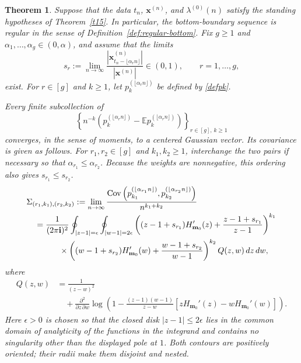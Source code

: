 \documentclass[11pt]{amsart}
\theoremstyle{plain}
\newtheorem{theorem}{Theorem}
\numberwithin{equation}{section}
\numberwithin{theorem}{section}
\numberwithin{figure}{section}
\begin{document}
\begin{theorem}
\label{t31}
Suppose that the data $t_n$, $\mathbf x^{(n)}$, and
$\lambda^{(0)}(n)$ satisfy the standing hypotheses of
Theorem~\ref{t15}.  In particular, the bottom-boundary sequence is
regular in the sense of Definition~\ref{def:regular-bottom}.  Fix $g\geq1$ and
$\alpha_1,\ldots,\alpha_g\in(0,\alpha)$, and assume that the limits
\begin{equation}
    s_r
    :=
    \lim_{n\to\infty}
    \frac{
        |\mathbf x^{(n)}_{t_n-\lfloor\alpha_r n\rfloor}|
    }{
        |\mathbf x^{(n)}|
    }
    \in(0,1),
    \qquad r=1,\ldots,g,
    \label{eq:section4-tail-limits}
\end{equation}
exist. For $r\in[g]$ and $k\geq1$, let
$p_k^{(\lfloor\alpha_rn\rfloor)}$ be defined by \eqref{defpk}.

Every finite subcollection of
\begin{equation}
    \left\{
        n^{-k}\left(
            p_k^{(\lfloor\alpha_rn\rfloor)}
            -\mathbb E p_k^{(\lfloor\alpha_rn\rfloor)}
        \right)
    \right\}_{r\in[g],\,k\geq1}
    \label{crv}
\end{equation}
converges, in the sense of moments, to a centered Gaussian vector. Its
covariance is given as follows. For $r_1,r_2\in[g]$ and
$k_1,k_2\geq1$,
{
interchange the two pairs if necessary so that
$\alpha_{r_1}\leq\alpha_{r_2}$.  Because the weights are nonnegative,
this ordering also gives $s_{r_1}\leq s_{r_2}$. }
\begin{align}
&\Sigma_{(r_1,k_1),(r_2,k_2)}
:=
\lim_{n\to\infty}
\frac{
    \operatorname{Cov}\left(
        p_{k_1}^{(\lfloor\alpha_{r_1}n\rfloor)},
        p_{k_2}^{(\lfloor\alpha_{r_2}n\rfloor)}
    \right)
}{n^{k_1+k_2}}
\label{covf}\\
&\quad=
\frac{1}{(2\pi\mathbf i)^2}
\oint_{|z-1|=\epsilon}
\oint_{|w-1|=2\epsilon}
\left(
    (z-1+s_{r_1})H_{\mathbf m_0}'(z)
    +\frac{z-1+s_{r_1}}{z-1}
\right)^{k_1}\notag\\
&\qquad\qquad\times
\left(
    (w-1+s_{r_2})H_{\mathbf m_0}'(w)
    +\frac{w-1+s_{r_2}}{w-1}
\right)^{k_2}
Q(z,w)\,dz\,dw,\notag
\end{align}
where
\begin{align*}
Q(z,w)
&=
\frac{1}{(z-w)^2}\\
&\quad+
\frac{\partial^2}{\partial z\,\partial w}
\log\left(
    1-
    \frac{(z-1)(w-1)}{z-w}
    \left[zH_{\mathbf m_0}'(z)-wH_{\mathbf m_0}'(w)\right]
\right).
\end{align*}
Here $\epsilon>0$ is chosen so that the closed disk
$|z-1|\leq2\epsilon$ lies in the common domain of analyticity of the
functions in the integrand and contains no singularity other than the
displayed pole at $1$. Both contours are positively oriented; their
radii make them disjoint and nested.
\end{theorem}
\end{document}
